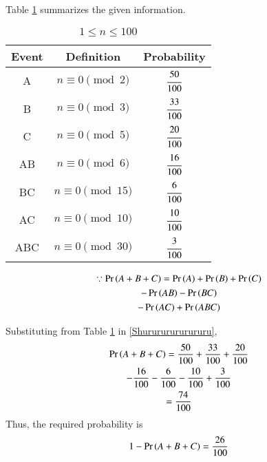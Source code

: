 Table \ref{gate:11} summarizes the given information. 
\begin{table}[!ht]
    \begin{center}
        \renewcommand{\arraystretch}{2.5}
    \begin{tabular}{|c|c|c|}
    \hline
    Event & Definition & Probability  \\
    \hline
    A    & $n \equiv 0 \pmod{2}$  & $\cfrac{50}{100}$ \\ \hline
    B    & $n \equiv 0 \pmod{3}$ & $\cfrac{33}{100}$ \\ \hline
    C    & $n \equiv 0 \pmod{5}$  & $\cfrac{20}{100}$ \\ \hline
    AB   & $n \equiv 0 \pmod{6}$ & $\cfrac{16}{100}$ \\ \hline
    BC   & $n \equiv 0 \pmod{15}$ & $\cfrac{6}{100}$ \\ \hline
    AC   & $n \equiv 0 \pmod{10}$ & $\cfrac{10}{100}$ \\ \hline
    ABC  & $n \equiv 0 \pmod{30}$ & $\cfrac{3}{100}$ \\
    \hline
    \end{tabular}
    \renewcommand{\arraystretch}{1}
    \end{center}
    \caption{$1 \le n \le 100$}
    \label{gate:11}
    \end{table}
%
\begin{multline}
\because     \Pr\left(A+B+C\right) = \Pr\left(A\right) + \Pr\left(B\right) + \Pr\left(C\right) \\- \Pr\left(AB\right) - \Pr\left(BC\right) \\- \Pr\left(AC\right) + \Pr\left(ABC\right)\label{Shurururururururu}    
\end{multline}

Substituting from Table \ref{gate:11} in \eqref{Shurururururururu},
\begin{multline}
    \Pr\left(A+B+C\right) = \frac{50}{100} + \frac{33}{100} + \frac{20}{100} \\- \frac{16}{100} - \frac{6}{100} - \frac{10}{100} + \frac{3}{100} 
    \\
    = \frac{74}{100}
\end{multline}
Thus, the  required probability is
\begin{align}
    1 - \Pr\left(A+B+C\right) = \frac{26}{100}
\end{align}
